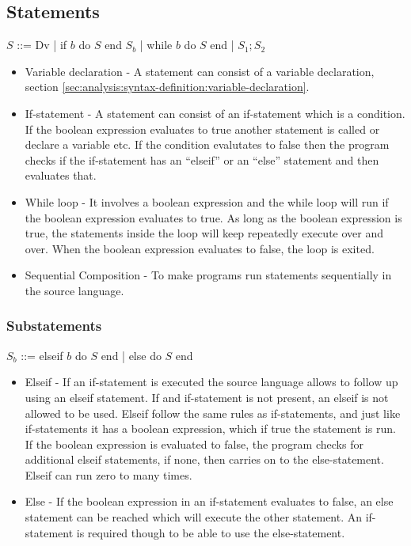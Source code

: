 \subsection{Statements}

$S$ ::= Dv | if $b$ do $S$ end $S_b$ | while $b$ do $S$ end | $S_1 ; S_2$

\begin{itemize}
	\item Variable declaration - A statement can consist of a variable declaration, section \ref{sec:analysis:syntax-definition:variable-declaration}.
	\item If-statement - A statement can consist of an if-statement which is a condition. If the boolean expression evaluates to true another statement is called or declare a variable etc. If the condition evalutates to false then the program checks if the if-statement has an ``elseif'' or an ``else'' statement and then evaluates that.
	\item While loop - It involves a boolean expression and the while loop will run if the boolean expression evaluates to true. As long as the boolean expression is true, the statements inside the loop will keep repeatedly execute over and over. When the boolean expression evaluates to false, the loop is exited.
	\item Sequential Composition - To make programs run statements sequentially in the source language.
\end{itemize}

\subsubsection{Substatements}

$S_b$ ::= {elseif $b$ do $S$ end} | else do $S$ end

\begin{itemize}
	\item Elseif - If an if-statement is executed the source language allows to follow up using an elseif statement. If and if-statement is not present, an elseif is not allowed to be used. Elseif follow the same rules as if-statements, and just like if-statements it has a boolean expression, which if true the statement is run. If the boolean expression is evaluated to false, the program checks for additional elseif statements, if none, then carries on to the else-statement. Elseif can run zero to many times.
	\item Else - If the boolean expression in an if-statement evaluates to false, an else statement can be reached which will execute the other statement. An if-statement is required though to be able to use the else-statement.
\end{itemize}

